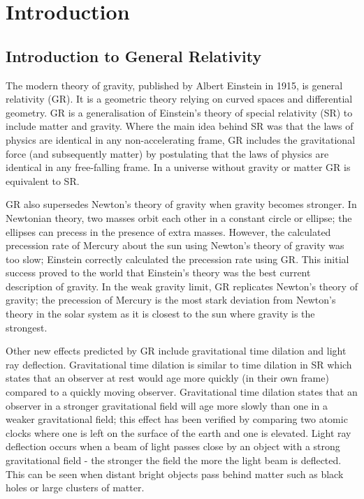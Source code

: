 

\section{Introduction}
\subsection{Introduction to General Relativity}

The modern theory of gravity, published by Albert Einstein in 1915, is general relativity (GR). It is a geometric theory relying on curved spaces and differential geometry. GR is a generalisation of Einstein's theory of special relativity (SR) to include matter and gravity. Where the main idea behind SR was that the laws of physics are identical in any non-accelerating frame, GR includes the gravitational force (and subsequently matter) by postulating that the laws of physics are identical in any free-falling frame. In a universe without gravity or matter GR is equivalent to SR.

GR also supersedes Newton's theory of gravity when gravity becomes stronger. In Newtonian theory, two masses orbit each other in a constant circle or ellipse; the ellipses can precess in the presence of extra masses. However, the calculated precession rate of Mercury about the sun using Newton's theory of gravity was too slow; Einstein correctly calculated the precession rate using GR. This initial success proved to the world that Einstein's theory was the best current description of gravity. In the weak gravity limit, GR replicates Newton's theory of gravity; the precession of Mercury is the most stark deviation from Newton's theory in the solar system as it is closest to the sun where gravity is the strongest. 

Other new effects predicted by GR include gravitational time dilation and light ray deflection. Gravitational time dilation is similar to time dilation in SR which states that an observer at rest would age more quickly (in their own frame) compared to a quickly moving observer. Gravitational time dilation states that an observer in a stronger gravitational field will age more slowly than one in a weaker gravitational field; this effect has been verified by comparing two atomic clocks where one is left on the surface of the earth and one is elevated. Light ray deflection occurs when a beam of light passes close by an object with a strong gravitational field - the stronger the field the more the light beam is deflected. This can be seen when distant bright objects pass behind matter such as black holes or large clusters of matter.

